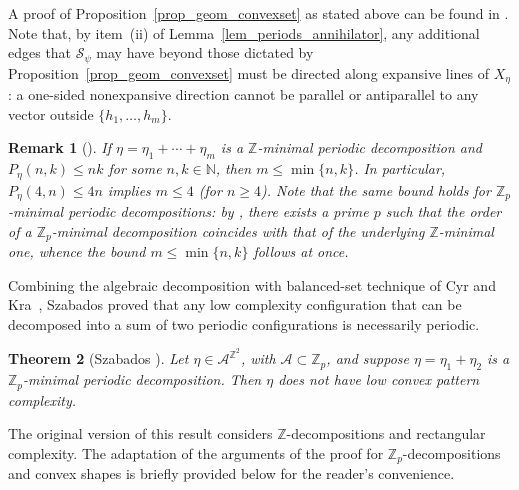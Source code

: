 \documentclass[12pt]{amsart}
\numberwithin{equation}{section}
\newtheorem{theorem}{Theorem}[section]
\newtheorem{remark}[theorem]{Remark}
\newcommand{\bb}[1]{\mathbb{#1}}
\begin{document}
A proof of Proposition~\ref{prop_geom_convexset} as stated above can be found in \cite[Proposition~2.9]{Colle22}. Note that, by item~(ii) of Lemma~\ref{lem_periods_annihilator}, any additional edges that $ \mathcal S_\psi $ may have beyond those dictated by Proposition~\ref{prop_geom_convexset} must be directed along expansive lines of $ X_\eta $: a one-sided nonexpansive direction cannot be parallel or antiparallel to any vector outside $ \{h_1, \ldots, h_m\} $.

\begin{remark}[{\cite[Remark~2.11]{Colle23}}]
\label{rem:order-bound}
If $\eta=\eta_1+\cdots+\eta_m$ is a $\mathbb Z$-minimal periodic decomposition and $P_\eta(n,k)\le nk$ for some $n,k\in\mathbb N$, then $m\le\min\{n,k\}$. In particular, $P_\eta(4,n)\le 4n$ implies $m\le 4$ (for $n\ge 4$). 
Note that the same bound holds for $\mathbb{Z}_p$-minimal periodic decompositions: by \cite[Theorem~1.5]{Colle22}, there exists a prime $ p $ such that the order of a $\mathbb{Z}_p$-minimal decomposition coincides with that of the underlying $\mathbb{Z}$-minimal one, whence the bound $m \le \min\{n,k\}$ follows at once.
\end{remark}

Combining the algebraic decomposition with balanced-set technique of Cyr and Kra~\cite{CyrKra15}, Szabados proved that any low complexity configuration that can be decomposed into a sum of two periodic configurations is necessarily periodic.

\begin{theorem}[Szabados \cite{Szabados18}]\label{main_theor_szabados}
Let $\eta \in \mathcal{A}^{\bb{Z}^2}$, with $\mathcal{A} \subset \bb{Z}_p$, and suppose $\eta = \eta_1+\eta_2$ is a $\bb{Z}_p$-minimal periodic decomposition. Then $\eta$ does not have low convex pattern com\-ple\-xi\-ty.
\end{theorem}

The original version of this result considers $\mathbb{Z}$-decompositions and rectangular complexity.
The adaptation of the arguments of the proof for $\mathbb{Z}_p$-decompositions and convex shapes is briefly provided below for the reader's convenience.
\end{document}
